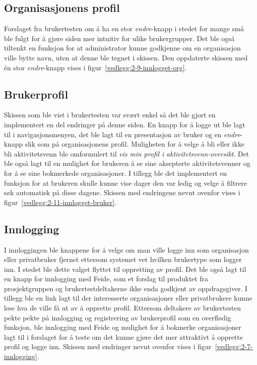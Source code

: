 \subsection{Organisasjonens profil}

Forslaget fra brukertesten om å ha en stor {\em endre}-knapp i stedet for mange små ble fulgt for å gjøre siden mer intuitiv for ulike brukergrupper. Det ble også tiltenkt en funksjon for at administrator kunne godkjenne om en organisasjon ville bytte navn, uten at denne ble tegnet i skissen. Den oppdaterte skissen med én stor {\em endre}-knapp vises i figur~\ref{vedlegg:2-9-innlogget-org}.

\subsection{Brukerprofil}
 
Skissen som ble vist i brukertesten var svært enkel så det ble gjort en implementert en del endringer på denne siden. En knapp for å logge ut ble lagt til i navigasjonsmenyen, det ble lagt til en presentasjon av bruker og en {\em endre}-knapp slik som på organisasjonens profil. Muligheten for å velge å bli eller ikke bli aktivitetsvenn ble omformulert til {\em vis min profil i aktivitetsvenn-oversikt}. Det ble også lagt til en mulighet for brukeren å se sine aksepterte aktivitetsvenner og for å se sine bokmerkede organisasjoner. I tillegg ble det implementert en funksjon for at brukeren skulle kunne vise dager den var ledig og velge å filtrere søk automatisk på disse dagene. Skissen med endringene nevnt ovenfor vises i figur~\ref{vedlegg:2-11-innlogget-bruker}.

\subsection{Innlogging}
 I innloggingen ble knappene for å velge om man ville logge inn som organisasjon eller privatbruker fjernet ettersom systemet vet hvilken brukertype som logger inn. I stedet ble dette valget flyttet til oppretting av profil. Det ble også lagt til en knapp for innlogging med Feide, som et forslag til produktet fra prosjektgruppen og brukertestdeltakerne ikke enda godkjent av oppdragsgiver. I tillegg ble en link lagt til der interesserte organisasjoner eller privatbrukere kunne lese hva de ville få ut av å opprette profil. Ettersom deltakere av brukertesten pekte pekte på innlogging og registrering av brukerprofil som en overflødig funksjon, ble innlogging med Feide og mulighet for å bokmerke organisasjoner lagt til i forslaget for å teste om det kunne gjøre det mer attraktivt å opprette profil og logge inn. Skissen med endringer nevnt ovenfor vises i figur~\ref{vedlegg:2-7-innlogging}.

